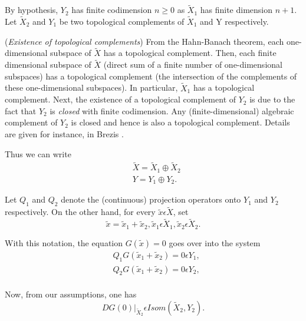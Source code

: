 By hypothesis, $Y_{2}$ has finite codimension $n \geq 0$ as $\widetilde{X}_{1}$ has finite dimension $n + 1$. Let $\widetilde{X}_{2}$ and $Y_{1}$ be two topological complements of $\widetilde{X}_{1}$ and Y respectively.

\begin{remark}\label{chap1-rem2.1}
({\em Existence of topological complements}) From the Hahn-Banach theorem, each one-dimensional subspace of $\widetilde{X}$ has a topological complement. Then, each finite dimensional subspace of $\widetilde{X}$ (direct sum of a finite number of one-dimensional subspaces) has a topological complement (the intersection of the complements of these one-dimensional subspaces). In particular, $\widetilde{X}_{1}$ has a topological complement. Next, the existence of a topological complement of $Y_{2}$ is due to the fact that $Y_{2}$ is {\em closed} with finite codimension. Any (finite-dimensional) algebraic complement of $Y_2$ is closed and hence is also a topological complement. Details are given for instance, in Brezis \cite{4}.
\end{remark}

Thus we can write
\begin{align*}
& \widetilde{X} = \widetilde{X}_{1} \oplus \widetilde{X}_{2}\tag{2.3}\label{chap1-eq2.3}\\
& Y = Y_{1} \oplus Y_{2}.\tag{2.4}\label{chap1-eq2.4}
\end{align*}

Let $Q_{1}$ and $Q_{2}$ denote the (continuous) projection operators onto $Y_{1}$ and $Y_{2}$ respectively. On the other hand, for every $\widetilde{x} \epsilon \widetilde{X}$, set 
$$
\widetilde{x} = \widetilde{x}_{1} + \widetilde{x}_{2}, \widetilde{x}_{1} \epsilon \widetilde{X}_{1}, \widetilde{x}_{2} \epsilon \widetilde{X}_{2}.
$$

With this notation, the equation $G(\widetilde{x}) = 0$ goes over into the system
\begin{align*}
& Q_{1} G(\widetilde{x}_{1} + \widetilde{x}_{2}) = 0 \epsilon Y_{1},\tag{2.5}\label{chap1-eq2.5}\\
& Q_{2} G(\widetilde{x}_{1} + \widetilde{x}_{2}) = 0 \epsilon Y_{2},\tag{2.6}\label{chap1-eq2.6}\\
\end{align*}\pageoriginale

Now, from our assumptions, one has
\begin{equation*}
DG(0) |_{\widetilde{X}_{2}} \epsilon Isom (\widetilde{X}_{2}, Y_{2}).\tag{2.7}\label{chap1-eq2.7}
\end{equation*}

